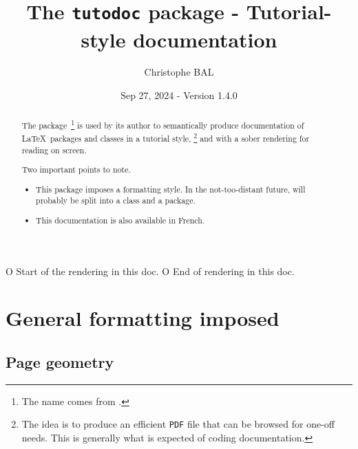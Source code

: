                       { O{ Start of the rendering in this doc. }
                         O{ End of rendering in this doc. } }{
        \nopagebreak\smallskip\nopagebreak
}{
        \nopagebreak\smallskip\nopagebreak
}





\title{The \texttt{tutodoc} package - Tutorial-style documentation}
\author{Christophe BAL}
\date{Sep 27, 2024 - Version 1.4.0}

\maketitle

\begin{abstract}
    The \thispack{} package\,%
    \footnote{
        The name comes from .
    }
    is used by its author to semantically produce documentation of \LaTeX\ packages and classes in a tutorial style,%
    \footnote{
        The idea is to produce an efficient \texttt{PDF} file that can be browsed for one-off needs. This is generally what is expected of coding documentation.
    }
    and with a sober rendering for reading on screen.

    \medskip

    Two important points to note.
    \begin{itemize}
        \item This package imposes a formatting style. In the not-too-distant future, \thispack{} will probably be split into a class and a package.

        \item This documentation is also available in French.
    \end{itemize}
\end{abstract}


\newpage
\tableofcontents
\newpage


\section{General formatting imposed}

\subsection{Page geometry}


